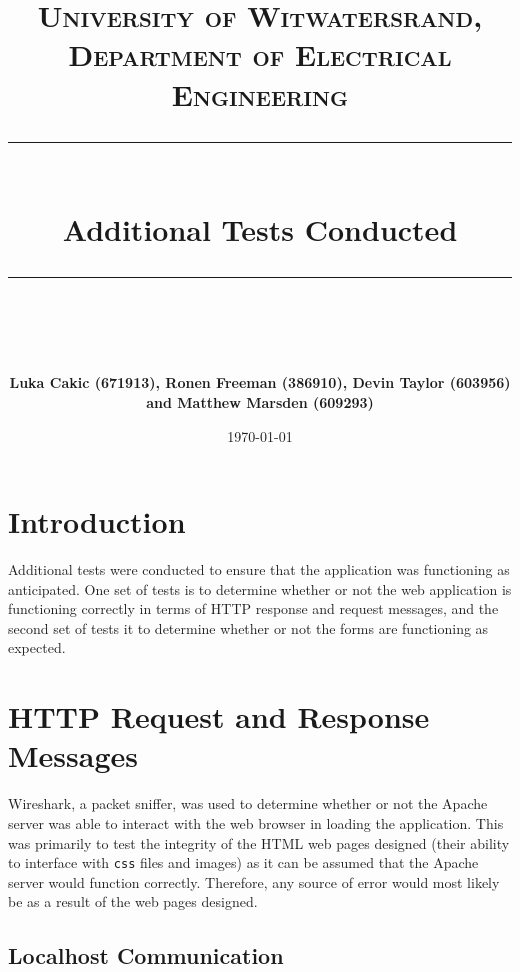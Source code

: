 \documentclass[10pt, a4paper, twocolumn]{scrartcl}
\begin{document}
 

\onecolumn
\thispagestyle{empty}

\newcommand{\horrule}[1]{\rule{\linewidth}{#1}}

	\title{\normalfont \normalsize
		\textsc{University of Witwatersrand, Department of Electrical Engineering} \\ [10pt]
		\horrule{0.5pt} \\ [10pt]
		\huge Additional Tests Conducted \\
		\horrule{2pt} \\ [10pt]}
	\author{\textbf{\normalsize{Luka Cakic (671913), Ronen Freeman (386910), Devin Taylor (603956) and Matthew Marsden (609293)}} \\ [10pt]}
	\date {\normalsize \today}
	
	\maketitle

\onecolumn

\section{Introduction}

	Additional tests were conducted to ensure that the application was functioning as anticipated. One set of tests is to determine whether or not the web application is functioning correctly in terms of HTTP response and request messages, and the second set of tests it to determine whether or not the forms are functioning as expected.
	
	
\section{HTTP Request and Response Messages}

	Wireshark, a packet sniffer, was used to determine whether or not the Apache server was able to interact with the web browser in loading the application. This was primarily to test the integrity of the HTML web pages designed (their ability to interface with \texttt{css} files and images) as it can be assumed that the Apache server would function correctly. Therefore, any source of error would most likely be as a result of the web pages designed.
	
	\subsection{Localhost Communication}	
	
\end{document}
